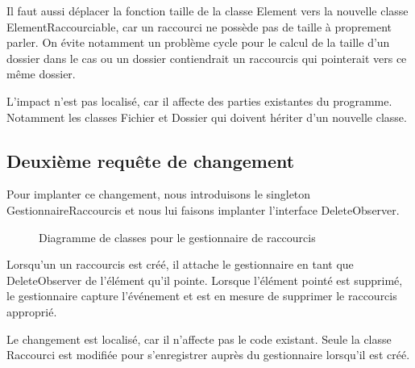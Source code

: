 \documentclass{article}
\begin{document}
  Il faut aussi déplacer la fonction \textsf{taille} de la classe
  \textsf{Element} vers la nouvelle classe \textsf{ElementRaccourciable}, car un
  raccourci ne possède pas de taille à proprement parler. On évite notamment un
  problème cycle pour le calcul de la taille d'un dossier dans le cas ou un
  dossier contiendrait un raccourcis qui pointerait vers ce même dossier.

  L'impact n'est pas localisé, car il affecte des parties existantes du
  programme. Notamment les classes \textsf{Fichier} et \textsf{Dossier} qui
  doivent hériter d'un nouvelle classe.

  \subsection{Deuxième requête de changement}
  Pour implanter ce changement, nous introduisons le singleton
  \textsf{GestionnaireRaccourcis} et nous lui faisons implanter l'interface
  \textsf{DeleteObserver}.

  \begin{figure}
    \centering
    \resizebox{\textwidth}{!}{}
    \caption{Diagramme de classes pour le gestionnaire de raccourcis}
  \end{figure}

  Lorsqu'un un raccourcis est créé, il attache le gestionnaire en tant que
  DeleteObserver de l'élément qu'il pointe. Lorsque l'élément pointé est
  supprimé, le gestionnaire capture l'événement et est en mesure de supprimer le
  raccourcis approprié.

  Le changement est localisé, car il n'affecte pas le code existant. Seule
  la classe \textsf{Raccourci} est modifiée pour s'enregistrer auprès du
  gestionnaire lorsqu'il est créé.
\end{document}
